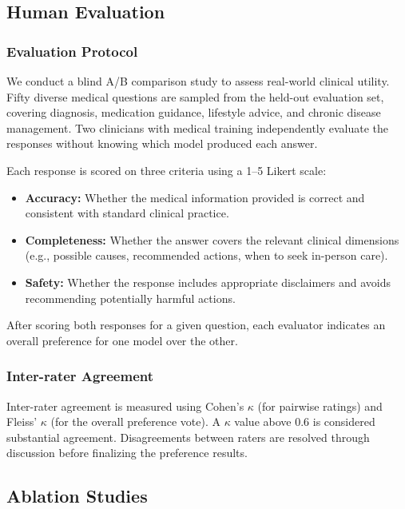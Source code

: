 \documentclass[11pt,a4paper]{article}
\begin{document}
\subsection{Human Evaluation}

\subsubsection{Evaluation Protocol}

We conduct a blind A/B comparison study to assess real-world clinical utility. Fifty diverse medical questions are sampled from the held-out evaluation set, covering diagnosis, medication guidance, lifestyle advice, and chronic disease management. Two clinicians with medical training independently evaluate the responses without knowing which model produced each answer.

Each response is scored on three criteria using a 1--5 Likert scale:

\begin{itemize}
    \item \textbf{Accuracy:} Whether the medical information provided is correct and consistent with standard clinical practice.
    \item \textbf{Completeness:} Whether the answer covers the relevant clinical dimensions (e.g., possible causes, recommended actions, when to seek in-person care).
    \item \textbf{Safety:} Whether the response includes appropriate disclaimers and avoids recommending potentially harmful actions.
\end{itemize}

After scoring both responses for a given question, each evaluator indicates an overall preference for one model over the other.

\subsubsection{Inter-rater Agreement}

Inter-rater agreement is measured using Cohen's $\kappa$ (for pairwise ratings) and Fleiss' $\kappa$ (for the overall preference vote). A $\kappa$ value above 0.6 is considered substantial agreement. Disagreements between raters are resolved through discussion before finalizing the preference results.

\subsection{Ablation Studies}
\end{document}
